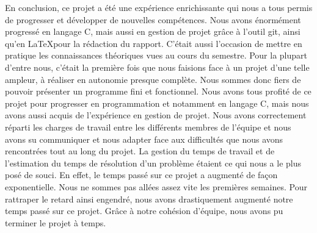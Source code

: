 \documentclass{article}
\begin{document}
En conclusion, ce projet a été une expérience enrichissante qui nous a tous permis de progresser et développer de nouvelles compétences.
\newline
Nous avons énormément progressé en langage C, mais aussi en gestion de projet grâce à l'outil git, ainsi qu'en \LaTeX pour la rédaction du rapport. C'était aussi l'occasion de mettre en pratique les connaissances théoriques vues au cours du semestre.
Pour la plupart d'entre nous, c'était la première fois que nous faisions face à un projet d'une telle ampleur, à réaliser en autonomie presque complète. Nous sommes donc fiers de pouvoir présenter un programme fini et fonctionnel. Nous avons tous profité de ce projet pour progresser en programmation et notamment en langage C, mais nous avons aussi acquis de l'expérience en gestion de projet. 
\newline
Nous avons correctement réparti les charges de travail entre les différents membres de l'équipe et nous avons su communiquer et nous adapter face aux difficultés que nous avons rencontrées tout au long du projet. La gestion du temps de travail et de l'estimation du temps de résolution d'un problème étaient ce qui nous a le plus posé de souci. En effet, le temps passé sur ce projet a augmenté de façon exponentielle. Nous ne sommes pas allées assez vite les premières semaines. Pour rattraper le retard ainsi engendré, nous avons drastiquement augmenté notre temps passé sur ce projet. Grâce à notre cohésion d'équipe, nous avons pu terminer le projet à temps.

	
\end{document}
